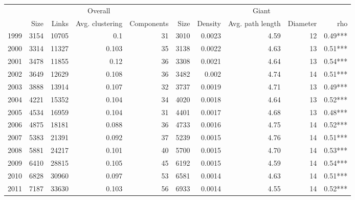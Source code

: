 \begin{tabular}{lrrrr|rrrrr}
\toprule
{} & \multicolumn{4}{c}{Overall} & \multicolumn{5}{c}{Giant} \\
{} &    Size &  Links & Avg. clustering & Components &  Size & Density & Avg. path length & Diameter &      rho \\
\midrule
1999 &    3154 &  10705 &             0.1 &         31 &  3010 &  0.0023 &             4.59 &       12 &  0.49*** \\
2000 &    3314 &  11327 &           0.103 &         35 &  3138 &  0.0022 &             4.63 &       13 &  0.51*** \\
2001 &    3478 &  11855 &            0.12 &         36 &  3308 &  0.0021 &             4.64 &       13 &  0.54*** \\
2002 &    3649 &  12629 &           0.108 &         36 &  3482 &   0.002 &             4.74 &       14 &  0.51*** \\
2003 &    3888 &  13914 &           0.107 &         32 &  3737 &  0.0019 &             4.71 &       13 &  0.49*** \\
2004 &    4221 &  15352 &           0.104 &         34 &  4020 &  0.0018 &             4.64 &       13 &  0.52*** \\
2005 &    4534 &  16959 &           0.104 &         31 &  4401 &  0.0017 &             4.68 &       13 &  0.48*** \\
2006 &    4875 &  18181 &           0.088 &         36 &  4733 &  0.0016 &             4.75 &       14 &  0.52*** \\
2007 &    5383 &  21391 &           0.092 &         37 &  5239 &  0.0015 &             4.76 &       14 &  0.51*** \\
2008 &    5881 &  24217 &           0.101 &         40 &  5700 &  0.0015 &             4.70 &       14 &  0.53*** \\
2009 &    6410 &  28815 &           0.105 &         45 &  6192 &  0.0015 &             4.59 &       14 &  0.54*** \\
2010 &    6828 &  30960 &           0.097 &         53 &  6581 &  0.0014 &             4.63 &       14 &  0.51*** \\
2011 &    7187 &  33630 &           0.103 &         56 &  6933 &  0.0014 &             4.55 &       14 &  0.52*** \\
\bottomrule
\end{tabular}
